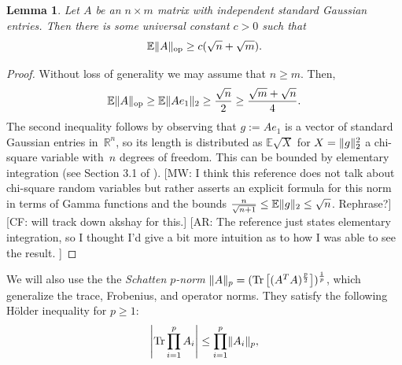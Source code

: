 \documentclass[aos]{imsart}
\newtheorem{lemma}[theorem]{Lemma}
\theoremstyle{definition}
\numberwithin{equation}{section}
\DeclareMathOperator{\op}{op}
\DeclareMathOperator{\tr}{Tr}
\DeclarePairedDelimiter{\abs}{\lvert}{\rvert}
\DeclarePairedDelimiter{\norm}{\lVert}{\rVert}
\newcommand{\R}{{\mathbb{R}}}
\newcommand{\E}{\mathbb{E}}
\newcommand{\CF}[1]{{\color{purple}[CF: #1]}}
\newcommand{\AR}[1]{{\color{orange}[AR: #1]}}
\newcommand{\MW}[1]{{\color{red}[MW: #1]}}
\newcommand{\CF}[1]{{}}
\newcommand{\AR}[1]{{}}
\newcommand{\MW}[1]{{}}
\begin{document}
\begin{appendix}
\begin{lemma}\label{lem:op norm lower bound}
Let $A$ be an $n \times m$ matrix with independent standard Gaussian entries. Then there is some universal constant $c > 0$ such that
\begin{equation*}
  \E \norm{A}_{\op} \geq c (\sqrt{n} + \sqrt{m}).
\end{equation*}
\end{lemma}
\begin{proof}
Without loss of generality we may assume that $n \geq m$.
Then,
\[ \E \norm{A}_{\op} \geq \E \norm{A e_{1}}_{2} \geq \frac{\sqrt{n}}{2} \geq \frac{\sqrt{m} + \sqrt{n}}{4}. \]
The second inequality follows by observing that $g := A e_1$ is a vector of standard Gaussian entries in~$\R^n$, so its length is distributed as $\E\sqrt X$ for $X = \norm g_2^2$ a chi-square variable with~$n$ degrees of freedom. This can be bounded by elementary integration (see Section 3.1 of \cite{ENormLB}).
\MW{I think this reference does not talk about chi-square random variables but rather asserts an explicit formula for this norm in terms of Gamma functions and the bounds $\frac n {\sqrt{n+1}} \leq \E\norm g_2 \leq \sqrt n$. Rephrase?}\CF{will track down akshay for this.} \AR{The reference just states elementary integration, so I thought I'd give a bit more intuition as to how I was able to see the result. }
\end{proof}

We will also use the the \emph{Schatten $p$-norm} $\norm{A}_p = (\tr\left[(A^TA)^{\frac p2}\right])^{\frac1p}$, which generalize the trace, Frobenius, and operator norms.
They satisfy the following H\"older inequality for $p\geq1$:
\begin{align}\label{eq:holder}
  \abs*{\tr \prod_{i=1}^{p} A_i} \leq \prod_{i=1}^{p} \norm{A_i}_p,
\end{align}


\end{appendix}
\end{document}
